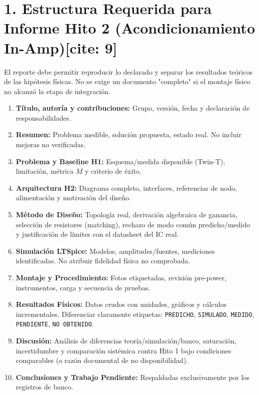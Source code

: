 \documentclass[10pt, a4paper]{article}
\begin{document}
\section*{1. Estructura Requerida para Informe Hito 2 (Acondicionamiento In-Amp)[cite: 9]}
El reporte debe permitir reproducir lo declarado y separar los resultados teóricos de las hipótesis físicas. No se exige un documento "completo" si el montaje físico no alcanzó la etapa de integración.
\begin{enumerate}
    \setlength{\itemsep}{2pt}
    \item \textbf{Título, autoría y contribuciones:} Grupo, versión, fecha y declaración de responsabilidades.
    \item \textbf{Resumen:} Problema medible, solución propuesta, estado real. No incluir mejoras no verificadas.
    \item \textbf{Problema y Baseline H1:} Esquema/medida disponible (Twin-T), limitación, métrica $M$ y criterio de éxito.
    \item \textbf{Arquitectura H2:} Diagrama completo, interfaces, referencias de nodo, alimentación y motivación del diseño.
    \item \textbf{Método de Diseño:} Topología real, derivación algebraica de ganancia, selección de resistores (matching), rechazo de modo común predicho/medido y justificación de límites con el datasheet del IC real.
    \item \textbf{Simulación LTSpice:} Modelos, amplitudes/fuentes, mediciones identificadas. No atribuir fidelidad física no comprobada.
    \item \textbf{Montaje y Procedimiento:} Fotos etiquetadas, revisión pre-power, instrumentos, carga y secuencia de pruebas.
    \item \textbf{Resultados Físicos:} Datos crudos con unidades, gráficos y cálculos incrementales. Diferenciar claramente etiquetas: \texttt{PREDICHO}, \texttt{SIMULADO}, \texttt{MEDIDO}, \texttt{PENDIENTE}, \texttt{NO OBTENIDO}.
    \item \textbf{Discusión:} Análisis de diferencias teoría/simulación/banco, saturación, incertidumbre y comparación sistémica contra Hito 1 bajo condiciones comparables (o razón documental de no disponibilidad).
    \item \textbf{Conclusiones y Trabajo Pendiente:} Respaldadas exclusivamente por los registros de banco.
\end{enumerate}
\end{document}
